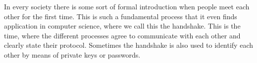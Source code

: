 
In every society there is some sort of formal introduction when people meet each other for the first time. This is such a fundamental process that it even finds application in computer science, where we call this the handshake. This is the time, where the different processes agree to communicate with each other and clearly state their protocol. Sometimes the handshake is also used to identify each other by means of private keys or passwords.

